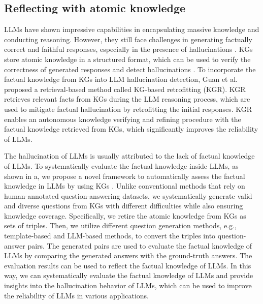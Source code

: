 \subsection{Reflecting with atomic knowledge}
LLMs have shown impressive capabilities in encapsulating massive knowledge and conducting reasoning. However, they still face challenges in generating factually correct and faithful responses, especially in the presence of hallucinations \cite{huang2023survey}. KGs store atomic knowledge in a structured format, which can be used to verify the correctness of generated responses and detect hallucinations \cite{agrawal2023can}. To incorporate the factual knowledge from KGs into LLM hallucination detection, Guan et al. \cite{guan2024mitigating} proposed a retrieval-based method called KG-based retrofitting (KGR). KGR retrieves relevant facts from KGs during the LLM reasoning process, which are used to mitigate factual hallucination by retrofitting the initial responses. KGR enables an autonomous knowledge verifying and refining procedure with the factual knowledge retrieved from KGs, which significantly improves the reliability of LLMs. 

The hallucination of LLMs is usually attributed to the lack of factual knowledge of LLMs. To systematically evaluate the factual knowledge inside LLMs, as shown in a, we propose a novel framework to automatically assess the factual knowledge in LLMs by using KGs \cite{luo2023systematic}. Unlike conventional methods that rely on human-annotated question-answering datasets, we systematically generate valid and diverse questions from KGs
with different difficulties while also ensuring knowledge coverage. Specifically, we retire the atomic knowledge from KGs as sets of triples. Then, we utilize different question generation methods, e.g., template-based and LLM-based methods, to convert the triples into question-answer pairs. The generated pairs are used to evaluate the factual knowledge of LLMs by comparing the generated answers with the ground-truth answers. The evaluation results can be used to reflect the factual knowledge of LLMs. In this way, we can systematically evaluate the factual knowledge of LLMs and provide insights into the hallucination behavior of LLMs, which can be used to improve the reliability of LLMs in various applications. 

